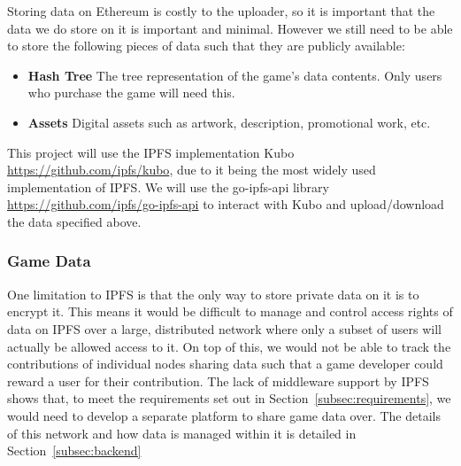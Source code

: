 Storing data on Ethereum is costly to the uploader, so it is important that the data we do store on it is important and minimal. However we still need to be able to store the following pieces of data such that they are publicly available:

\begin{itemize}
  \item \textbf{Hash Tree} The tree representation of the game's data contents. Only users who purchase the game will need this.
  \item \textbf{Assets} Digital assets such as artwork, description, promotional work, etc.  
\end{itemize}

\vspace{2mm}\noindent
This project will use the IPFS implementation Kubo \url{https://github.com/ipfs/kubo}, due to it being the most widely used implementation of IPFS. We will use the go-ipfs-api library \url{https://github.com/ipfs/go-ipfs-api} to interact with Kubo and upload/download the data specified above.

\subsubsection*{Game Data}

One limitation to IPFS is that the only way to store private data on it is to encrypt it. This means it would be difficult to manage and control access rights of data on IPFS over a large, distributed network where only a subset of users will actually be allowed access to it. 
On top of this, we would not be able to track the contributions of individual nodes sharing data such that a game developer could reward a user for their contribution. 
\x
The lack of middleware support by IPFS shows that, to meet the requirements set out in Section~\ref{subsec:requirements}, we would need to develop a separate platform to share game data over.
The details of this network and how data is managed within it is detailed in Section~\ref{subsec:backend}
